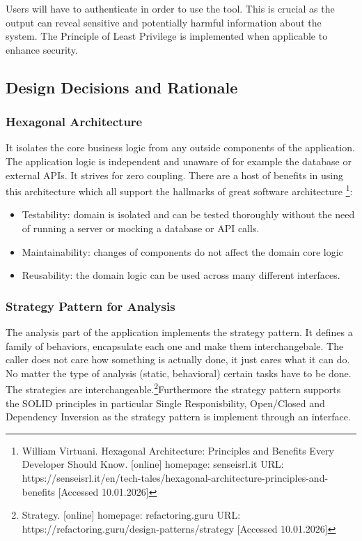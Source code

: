 Users will have to authenticate in order to use the tool. This is crucial as the output can reveal sensitive and potentially harmful information about the system. \newline The Principle of Least Privilege is implemented when applicable to enhance security. 

\subsection{Design Decisions and Rationale}

\subsubsection{Hexagonal Architecture}

It isolates the core business logic from any outside components of the application. The application logic is independent and unaware of for example the database or external APIs. It strives for zero coupling. There are a host of benefits in using this architecture which all support the hallmarks of great software architecture \footnote{William Virtuani. Hexagonal Architecture: Principles and Benefits Every Developer Should Know. [online] homepage: senseisrl.it URL: https://senseisrl.it/en/tech-tales/hexagonal-architecture-principles-and-benefits [Accessed 10.01.2026]}:

\begin{itemize}
	\item Testability: domain is isolated and can be tested thoroughly without the need of running a server or mocking a database or API calls.
	\item Maintainability: changes of components do not affect the domain core logic
	\item Reusability: the domain logic can be used across many different interfaces.
\end{itemize}


\subsubsection{Strategy Pattern for Analysis}

The analysis part of the application implements the strategy pattern. It defines a family of behaviors, encapsulate each one and make them interchangebale. The caller does not care how something is actually done, it just cares what it can do. No matter the type of analysis (static, behavioral) certain tasks have to be done. The strategies are interchangeable.\footnote{Strategy. [online] homepage: refactoring.guru URL: https://refactoring.guru/design-patterns/strategy [Accessed 10.01.2026]}\newline Furthermore the strategy pattern supports the SOLID principles in particular Single Responisbility, Open/Closed and Dependency Inversion as the strategy pattern is implement through an interface.

